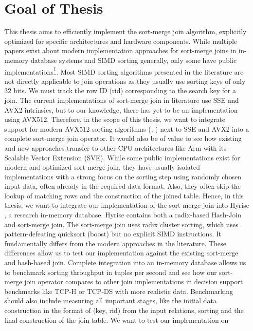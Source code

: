 \section{Goal of Thesis}
\label{sec:goal}


This thesis aims to efficiently implement the sort-merge join algorithm,
explicitly optimized for specific architectures and hardware components. While multiple papers
exist about modern implementation approaches for sort-merge joins in in-memory database systems
and SIMD sorting generally, only some have public 
implementations\footnote{Implementation of \cite{Balkesen} published at \url{https://archive-systems.ethz.ch/node/334}}.
Most SIMD sorting algorithms
presented in the literature are not directly applicable to join operations as they usually use
sorting keys of only 32 bits. We must track the row ID (rid) corresponding to the search key for
a join. The current implementations of sort-merge join in literature use SSE and AVX2 intrinsics,
but to our knowledge, there has yet to be an implementation using AVX512. Therefore, in the scope
of this thesis, we want to integrate support for modern AVX512 sorting algorithms (\cite{Watkins}, \cite{8855628})
next to SSE and AVX2 into a complete sort-merge join operator.
It would also be of value to see how existing and new approaches transfer to other
CPU architectures like Arm with its Scalable Vector Extension (SVE). While some public implementations
exist for modern and optimized sort-merge join, they have usually isolated implementations with a strong
focus on the sorting step using randomly chosen input data, often already in the required data format. 
Also, they often skip the lookup of matching rows and the construction of the joined table.
Hence, in this thesis, we want to integrate our implementation of the sort-merge join into Hyrise
\cite{DBLP:conf/edbt/DreselerK0KUP19},
a research in-memory database. Hyrise contains both a radix-based Hash-Join and sort-merge join.
The sort-merge join uses radix cluster sorting, which uses pattern-defeating quicksort (boost)
but no explicit SIMD instructions. It fundamentally differs from the modern approaches in the literature.
These differences allow us to test our implementation against the existing sort-merge and hash-based join.
Complete integration into an in-memory database allows us to benchmark sorting throughput in
tuples per second and see how our sort-merge join operator compares to other join implementations
in decision support benchmarks like TCP-H or TCP-DS with more realistic data. Benchmarking should
also include measuring all important stages, like the initial data construction in
the format of (key, rid) from the input relations, sorting and the final construction of the join table.
We want to test our implementation on different architectures and hardware, taking advantage of
differences in core count, cache size, SIMD registers with different widths, NUMA regions, 
and other hardware-specific properties.
